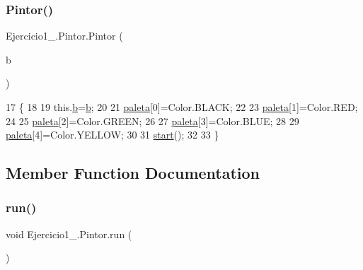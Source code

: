 \subsubsection{\texorpdfstring{Pintor()}{Pintor()}}
{\footnotesize\ttfamily Ejercicio1\+\_.\+Pintor.\+Pintor (\begin{DoxyParamCaption}\item[{J\+Button}]{b }\end{DoxyParamCaption})\hspace{0.3cm}{\ttfamily [inline]}}


\begin{DoxyCode}
17                             \{
18 
19         this.\mbox{\hyperlink{class_ejercicio1__3_1_1_pintor_a3025354dffadefccce6ca19ede04c171}{b}}=\mbox{\hyperlink{class_ejercicio1__3_1_1_pintor_a3025354dffadefccce6ca19ede04c171}{b}};
20 
21         \mbox{\hyperlink{class_ejercicio1__3_1_1_pintor_a0e0b6ca6f1510ec416a533e3d94a59e2}{paleta}}[0]=Color.BLACK;
22 
23         \mbox{\hyperlink{class_ejercicio1__3_1_1_pintor_a0e0b6ca6f1510ec416a533e3d94a59e2}{paleta}}[1]=Color.RED;
24 
25         \mbox{\hyperlink{class_ejercicio1__3_1_1_pintor_a0e0b6ca6f1510ec416a533e3d94a59e2}{paleta}}[2]=Color.GREEN;
26 
27         \mbox{\hyperlink{class_ejercicio1__3_1_1_pintor_a0e0b6ca6f1510ec416a533e3d94a59e2}{paleta}}[3]=Color.BLUE;
28 
29         \mbox{\hyperlink{class_ejercicio1__3_1_1_pintor_a0e0b6ca6f1510ec416a533e3d94a59e2}{paleta}}[4]=Color.YELLOW;
30 
31         \mbox{\hyperlink{namespaceejemplo_1_1clase_abcf43191f0ecf3b071ca2db7696ba821}{start}}();
32 
33     \}
\end{DoxyCode}


\subsection{Member Function Documentation}
\mbox{\label{class_ejercicio1__3_1_1_pintor_ad4d958156bfe9f43c4a54191751d4537}} 
\subsubsection{\texorpdfstring{run()}{run()}}
{\footnotesize\ttfamily void Ejercicio1\+\_.\+Pintor.\+run (\begin{DoxyParamCaption}{ }\end{DoxyParamCaption})\hspace{0.3cm}{\ttfamily [inline]}}


